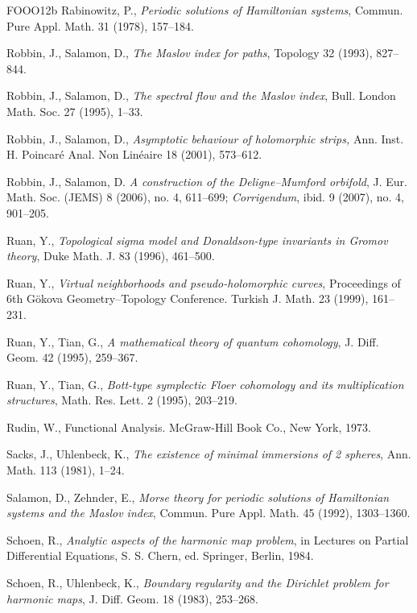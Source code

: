 \begin{thebibliography}{FOOO12b}
 Rabinowitz, P., \emph{Periodic solutions of Hamiltonian systems}, Commun. Pure Appl.
  Math. 31 (1978), 157–184.

 Robbin, J., Salamon, D., \emph{The Maslov index for paths}, Topology 32 (1993),
  827–844.

 Robbin, J., Salamon, D., \emph{The spectral flow and the Maslov index}, Bull. London
  Math. Soc. 27 (1995), 1–33.

 Robbin, J., Salamon, D., \emph{Asymptotic behaviour of holomorphic strips,} Ann.
  Inst. H. Poincaré Anal. Non Linéaire 18 (2001), 573–612.

 Robbin, J., Salamon, D. \emph{A construction of the Deligne–Mumford orb\-ifold}, J.
  Eur. Math. Soc. (JEMS) 8 (2006), no. 4, 611–699; \emph{Corrigendum}, ibid. 9 (2007), no. 4, 901–205.

 Ruan, Y., \emph{Topological sigma model and Donaldson-type invariants in Gromov
  theory}, Duke Math. J. 83 (1996), 461–500.

 Ruan, Y., \emph{Virtual neighborhoods and pseudo-holomorphic curves}, Pro\-ceedings
  of 6th Gökova Geometry–Topology Conference. Turkish J. Math. 23 (1999), 161–231.

 Ruan, Y., Tian, G., \emph{A mathematical theory of quantum cohomology}, J. Diﬀ.
  Geom. 42 (1995), 259–367.

 Ruan, Y., Tian, G., \emph{Bott-type symplectic Floer cohomology and its
  multiplication structures}, Math. Res. Lett. 2 (1995), 203–219.

 Rudin, W., Functional Analysis. McGraw-Hill Book Co., New York, 1973.

 Sacks, J., Uhlenbeck, K., \emph{The existence of minimal immersions of 2 spheres},
  Ann. Math. 113 (1981), 1–24.

 Salamon, D., Zehnder, E., \emph{Morse theory for periodic solutions of Hamil\-tonian
  systems and the Maslov index}, Commun. Pure Appl. Math. 45 (1992), 1303–1360.

 Schoen, R., \emph{Analytic aspects of the harmonic map problem}, in Lec\-tures on
  Partial Diﬀerential Equations, S. S. Chern, ed. Springer, Berlin, 1984.

 Schoen, R., Uhlenbeck, K., \emph{Boundary regularity and the Dirichlet problem for
  harmonic maps}, J. Diﬀ. Geom. 18 (1983), 253–268.


\end{thebibliography}
